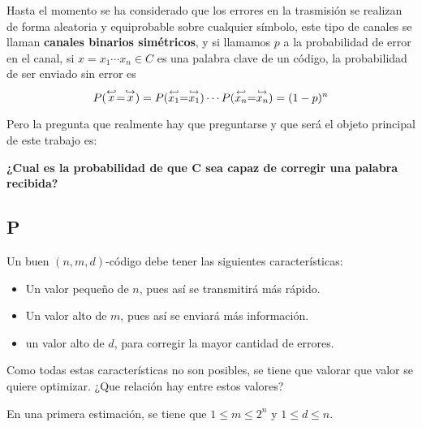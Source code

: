 Hasta el momento se ha considerado que los errores en la trasmisión se realizan de forma aleatoria y equiprobable sobre cualquier símbolo, este tipo de canales se llaman \textbf{canales binarios simétricos}, y si llamamos $p$ a la probabilidad de error en el canal, si $x=x_1\cdots x_n\in C$ es una palabra clave de un código, la probabilidad de ser enviado sin error es
\[
	P(\stackrel{\hookleftarrow}{x} = \stackrel{\hookrightarrow}{x}) =P(\stackrel{\hookleftarrow}{x_1} = \stackrel{\hookrightarrow}{x_1})\cdots P(\stackrel{\hookleftarrow}{x_n} = \stackrel{\hookrightarrow}{x_n})=(1-p)^n
\]

Pero la pregunta que realmente hay que preguntarse y que será el objeto principal de este trabajo es:

\textbf{¿Cual es la probabilidad de que C sea capaz de corregir una palabra recibida?}

\subsection{P}

Un buen $(n, m, d)$-código debe tener las siguientes características:
\begin{itemize}
	\item Un valor pequeño de $n$, pues así se transmitirá más rápido.
	\item Un valor alto de $m$, pues así se enviará más información.
	\item un valor alto de $d$, para corregir la mayor cantidad de errores.
\end{itemize}

Como todas estas características no son posibles, se tiene que valorar que valor se quiere optimizar.
¿Que relación hay entre estos valores?

En una primera estimación, se tiene que $1\leq m\leq 2^n$ y $1\leq d\leq n$.


